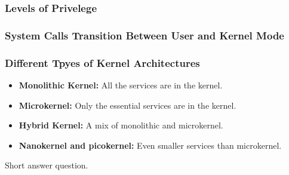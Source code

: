 \subsubsection{Levels of Privelege}
\begin{definition}
\end{definition}

\subsubsection{System Calls Transition Between User and Kernel Mode}
\begin{definition}
\end{definition}

\subsubsection{Different Tpyes of Kernel Architectures}
\begin{definition}
    \begin{itemize}
        \item \textbf{Monolithic Kernel:} All the services are in the kernel.
        \item \textbf{Microkernel:} Only the essential services are in the kernel.
        \item \textbf{Hybrid Kernel:} A mix of monolithic and microkernel.
        \item \textbf{Nanokernel and picokernel:} Even smaller services than microkernel.
    \end{itemize}
\end{definition}

\begin{warning}
    Short answer question.
\end{warning}